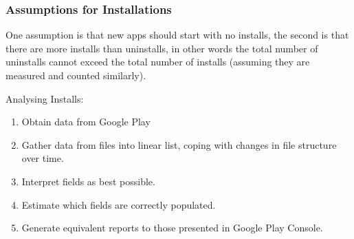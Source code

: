 \subsubsection{Assumptions for Installations } 
One assumption is that new apps should start with no installs, the second is that there are more installs than uninstalls, in other words the total number of uninstalls cannot exceed the total number of installs (assuming they are measured and counted similarly).

Analysing Installs: 
\begin{enumerate}
    \item Obtain data from Google Play
    \item Gather data from files into linear list, coping with changes in file structure over time.
    \item Interpret fields as best possible.
    \item Estimate which fields are correctly populated.
    \item Generate equivalent reports to those presented in Google Play Console.
\end{enumerate}

